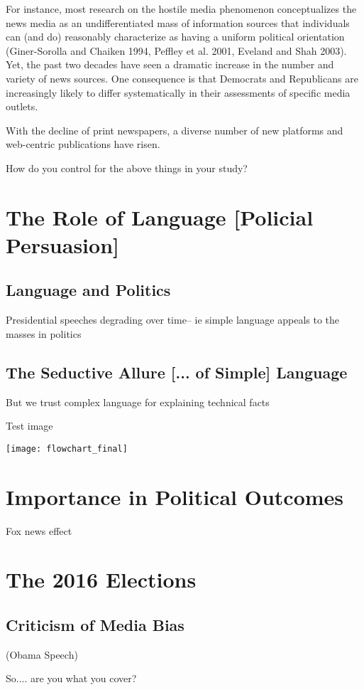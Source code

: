 For instance, most research on the hostile media phenomenon conceptualizes the news media as an undifferentiated mass of information sources that individuals can (and do) reasonably characterize as having a uniform political orientation (Giner-Sorolla and Chaiken 1994, Peffley et al. 2001, Eveland and Shah 2003). Yet, the past two decades have seen a dramatic increase in the number and variety of news sources. One consequence is that Democrats and Republicans are increasingly likely to differ systematically in their assessments of specific media outlets.






With the decline of print newspapers, a diverse number of new platforms and web-centric publications have risen.


How do you control for the above things in your study?

\section{The Role of Language [Policial Persuasion]}




\subsection{Language and Politics}
Presidential speeches degrading over time-- ie simple language appeals to the masses in politics
\subsection{The Seductive Allure [... of Simple] Language}
But we trust complex language for explaining technical facts

Test image

\texttt{[image: flowchart\_final]}


\section{Importance in Political Outcomes}
Fox news effect 

\section{The 2016 Elections} 
\subsection{Criticism of Media Bias} 
(Obama Speech)

So.... are you what you cover?








